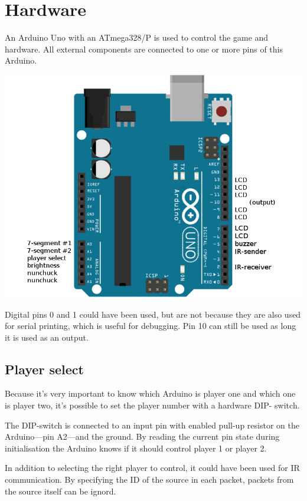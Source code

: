 \section{Hardware}
\label{sec:hardware}
An Arduino Uno with an ATmega328/P\cite{uno} is used to control the game and
hardware. All external components are connected to one or more pins of this
Arduino.

\includegraphics[width=\textwidth,height=\textheight,keepaspectratio]{res/pinmap.png}

Digital pins 0 and 1 could have been used, but are not because they are also
used for serial printing, which is useful for debugging. Pin 10 can still be
used as long it is used as an output.

\subsection{Player select}
\label{sec:playerselect}

Because it's very important to know which Arduino is player one and which one
is player two, it's possible to set the player number with a hardware DIP-
switch.

The DIP-switch is connected to an input pin with enabled pull-up resistor on
the Arduino---pin A2---and the ground. By reading the current pin state during
initialisation the Arduino knows if it should control player 1 or player 2.

In addition to selecting the right player to control, it could have been used
for IR communication. By specifying the ID of the source in each packet,
packets from the source itself can be ignord.

